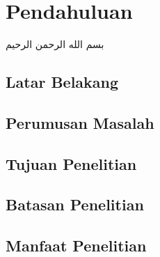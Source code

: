 \chapter{Pendahuluan}


بسم الله الرحمن الرحيم


\lipsum[1]

\section{Latar Belakang}

\lipsum[1]

\section{Perumusan Masalah}

\lipsum[1]

\section{Tujuan Penelitian}

\lipsum[1]

\section{Batasan Penelitian}

\lipsum[1]

\section{Manfaat Penelitian}

\lipsum[1]